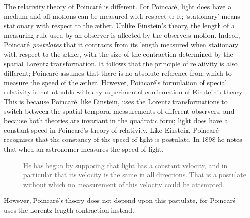 \documentclass[10pt, fleqn,final,showtrims,oldfontcommands, article,a4paper,oneside]{memoir} %
\newcommand{\aether}{\ae ther}
\newcommand{\Poincare}{Poincar{\'e}\xspace}
\begin{document}
The relativity theory of \Poincare is different.
For \Poincare, light does have a medium and all motions can be  measured with respect to it;
`stationary' means stationary with respect to the \aether\cite{Poincare1908,PoincareScienceAndMethod,Pierseaux2005}.
Unlike Einstein's theory, the length of a measuring rule used by an observer is affected by the observers motion.
Indeed, \Poincare\ {\em postulates} that it contracts from its  length measured when stationary with respect to the \aether,
with the size of the contraction  determined by the spatial Lorentz transformation\cite{Poincare1906, Pierseaux2005}.
It follows that the principle of relativity  is also different;
\Poincare assumes  that there is no absolute reference from  which to measure the speed of the \aether\cite{Poincare1906}.
However, \Poincare's formulation of special relativity is not at odds with any experimental confirmation of Einstein's theory\cite{Pierseaux2001}.
This is because \Poincare, like Einstein, uses the Lorentz transformations to switch between the spatial-temporal measurements of different observers,
and because both theories are invariant in  the quadratic form;
light does have a constant speed in  \Poincare's theory of relativity\cite{Pierseaux2001}.
Like Einstein, \Poincare recognises that the constancy of the speed of light is postulate.
In 1898\cite{Poincare1898} he notes that when an astronomer measures the speed of light, 
\begin{quote}
  He has begun by supposing that light has a constant velocity, 
  and in particular that its velocity is the same in all directions. 
  That is a postulate without which no measurement of this velocity could be attempted. 
\end{quote}
However, \Poincare's  theory does not depend upon this postulate,
for \Poincare uses the Lorentz length contraction instead\cite{Pierseaux2005}.
\end{document}
